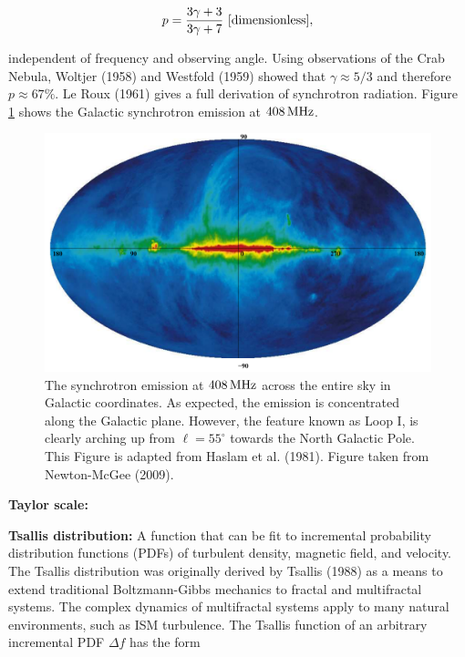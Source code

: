 \documentclass[a4paper,11pt]{article}
\begin{document}
\begin{align*}
    p = \frac{3\gamma + 3}{3\gamma+7} ~ [{\rm dimensionless}],
\end{align*}

{\noindent}independent of frequency and observing angle. Using observations of the Crab Nebula, Woltjer (1958) and Westfold (1959) showed that $\gamma\approx5/3$ and therefore $p\approx67\%$. Le Roux (1961) gives a full derivation of synchrotron radiation. Figure \ref{figure:408mhz} shows the Galactic synchrotron emission at $408\,{\rm MHz}$.

\begin{figure}[h]
\begin{center}
\includegraphics[width=15cm]{figures/408MHz.png}
\caption{The synchrotron emission at $408\,{\rm MHz}$ across the entire sky in Galactic coordinates. As expected, the emission is concentrated along the Galactic plane. However, the feature known as Loop I, is clearly arching up from $\ell=55^\circ$ towards the North Galactic Pole. This Figure is adapted from Haslam et al. (1981). Figure taken from Newton-McGee (2009).}
\label{figure:408mhz}
\end{center}
\end{figure}

{\noindent}\textbf{Taylor scale:}

{\noindent}\textbf{Tsallis distribution:} A function that can be fit to incremental probability distribution functions (PDFs) of turbulent density, magnetic field, and velocity. The Tsallis distribution was originally derived by Tsallis (1988) as a means to extend traditional Boltzmann-Gibbs mechanics to fractal and multifractal systems. The complex dynamics of multifractal systems apply to many natural environments, such as ISM turbulence. The Tsallis function of an arbitrary incremental PDF $\Delta f$ has the form
\end{document}
